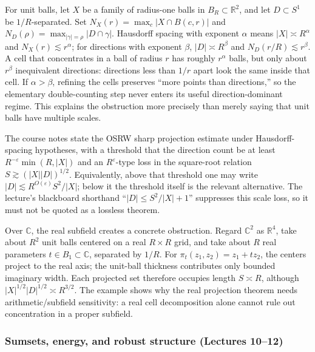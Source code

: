 For unit balls, let \(X\) be a family of radius-one balls in \(B_R\subset\mathbb R^2\), and let \(D\subset S^1\) be \(1/R\)-separated. Set \(N_X(r)=\max_c|X\cap B(c,r)|\) and \(N_D(\rho)=\max_{|\gamma|=\rho}|D\cap\gamma|\). Hausdorff spacing with exponent \(\alpha\) means \(|X|\asymp R^\alpha\) and \(N_X(r)\lesssim r^\alpha\); for directions with exponent \(\beta\), \(|D|\asymp R^\beta\) and \(N_D(r/R)\lesssim r^\beta\). A cell that concentrates in a ball of radius \(r\) has roughly \(r^\alpha\) balls, but only about \(r^\beta\) inequivalent directions: directions less than \(1/r\) apart look the same inside that cell. If \(\alpha>\beta\), refining the cells preserves ``more points than directions,'' so the elementary double-counting step never enters its useful direction-dominant regime. This explains the obstruction more precisely than merely saying that unit balls have multiple scales.

The course notes state the OSRW sharp projection estimate under Hausdorff-spacing hypotheses, with a threshold that the direction count be at least \(R^{-\varepsilon}\min(R,|X|)\) and an \(R^{\varepsilon}\)-type loss in the square-root relation \(S\gtrsim (|X||D|)^{1/2}\). Equivalently, above that threshold one may write \(|D|\lesssim R^{O(\varepsilon)}S^2/|X|\); below it the threshold itself is the relevant alternative. The lecture's blackboard shorthand ``\(|D|\le S^2/|X|+1\)'' suppresses this scale loss, so it must not be quoted as a lossless theorem.

Over \(\mathbb C\), the real subfield creates a concrete obstruction. Regard \(\mathbb C^2\) as \(\mathbb R^4\), take about \(R^2\) unit balls centered on a real \(R\times R\) grid, and take about \(R\) real parameters \(t\in B_1\subset\mathbb C\), separated by \(1/R\). For \(\pi_t(z_1,z_2)=z_1+tz_2\), the centers project to the real axis; the unit-ball thickness contributes only bounded imaginary width. Each projected set therefore occupies length \(S\asymp R\), although \(|X|^{1/2}|D|^{1/2}\asymp R^{3/2}\). The example shows why the real projection theorem needs arithmetic/subfield sensitivity: a real cell decomposition alone cannot rule out concentration in a proper subfield.

\subsubsection{Sumsets, energy, and robust structure (Lectures 10--12)}\label{04-visual-computing-ii-ch033-sumsets-energy-and-robust-structure-lectures-1012}

